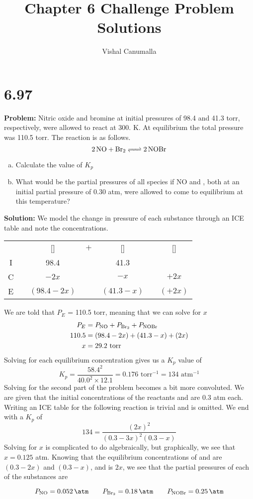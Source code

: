 \documentclass[11 pt]{article}
\title{Chapter 6 Challenge Problem Solutions}
\author{Vishal Canumalla}
\makeatletter
\newcommand{\icetable}[9]{
    \begin{tabular}{cc@{}c@{}c@{}c@{}c@{}c}

    & &   [\ce{#2#1}]& ${}+{}$ & [\ce{#4#3}] & \ce{<=>}& [\ce{#6#5}]\\
 
  I & &       #7    &&   #8                      &&  #9    \\
  C & &       $- #2x$    &&   $- #4x$                         &&  $+ #6x$    \\
  E & &       $(#7 - #2x)$    &&   $(#8 - #4x)$                         &&  $(#9 + #6x)$    \\
 
    \end{tabular}


}
\makeatother
\begin{document}
\maketitle

\section*{6.97} 
\begin{problemBox}
  

\textbf{Problem:} Nitric oxide and bromine at initial pressures of 98.4 and 41.3 torr, respectively, were allowed to react at 300. K. At equilibrium the total pressure was 110.5 torr. The reaction is as follows.
$$\ce{2NO + Br2 <=> 2NOBr}$$
\begin{enumerate}[a)]
    \item Calculate the value of $K_p$
    \item What would be the partial pressures of all species if
NO and , both at an initial partial pressure of
0.30 atm, were allowed to come to equilibrium at
this temperature?
\end{enumerate}
\end{problemBox}
\textbf{Solution:} We model the change in pressure of each substance through an ICE table and note the concentrations.
\begin{center}
 \icetable{NO}{2}{Br2}{}{NOBr}{2}{98.4}{41.3}{}
\end{center}
We are told that $P_{E}$ = 110.5 torr, meaning that we can solve for $x$
\begin{align*}
P_E &= P_{\ce{NO}} + P_{\ce{Br2}} + P_{\ce{NOBr}} \\
    110.5 &= (98.4 - 2x) + (41.3 - x) + (2x) \\
    x &= 29.2 \text{ torr}
\end{align*}
Solving for each equilibrium concentration gives us a $K_p$ value of 
$$K_p = \frac{58.4^2}{40.0^2 \times 12.1} = 0.176 \text{ torr}^{-1} = \boxed{134 \text{ atm}^{-1}}$$
Solving for the second part of the problem becomes a bit more convoluted. We are given that the initial concentrations of the reactants  and  are 
0.3 atm each. Writing an ICE table for the following reaction is trivial and is omitted. We end with a $K_p$ of 
$$134 =  \frac{(2x)^2}{(0.3-3x)^2(0.3-x)}$$
Solving for $x$ is complicated to do algebraically, but graphically, we see that $x = 0.125$ atm. Knowing
that the equilibrium concentrations of  and  are $(0.3 - 2x)$ and $(0.3 - x)$, and 
 is $2x$, we see that the partial pressures of each of the substances are
\begin{answerBox}
  $$ P_{\ce{NO}} = \SI{0.052}{\atm} \qquad P_{\ce{Br2}} = \SI{0.18}{\atm} \qquad P_{\ce{NOBr}} = \SI{0.25}{\atm}$$
\end{answerBox}
\end{document}
